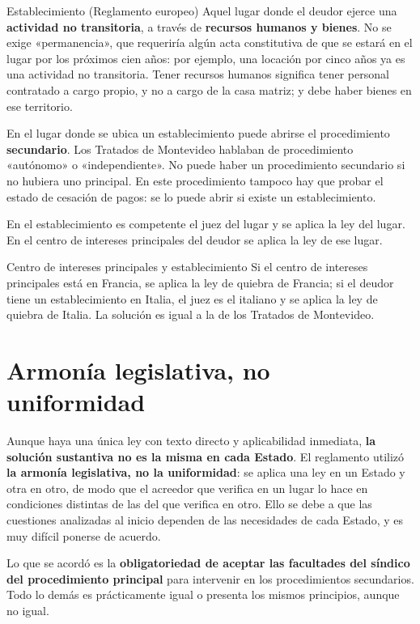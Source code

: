 \documentclass[12pt,oneside]{book}
\begin{document}
\begin{definition}{Establecimiento (Reglamento europeo)}
Aquel lugar donde el deudor ejerce una \textbf{actividad no transitoria}, a través de \textbf{recursos humanos y bienes}. No se exige «permanencia», que requeriría algún acta constitutiva de que se estará en el lugar por los próximos cien años: por ejemplo, una locación por cinco años ya es una actividad no transitoria. Tener recursos humanos significa tener personal contratado a cargo propio, y no a cargo de la casa matriz; y debe haber bienes en ese territorio.
\end{definition}

En el lugar donde se ubica un establecimiento puede abrirse el procedimiento \textbf{secundario}. Los Tratados de Montevideo hablaban de procedimiento «autónomo» o «independiente». No puede haber un procedimiento secundario si no hubiera uno principal. En este procedimiento tampoco hay que probar el estado de cesación de pagos: se lo puede abrir si existe un establecimiento.

En el establecimiento es competente el juez del lugar y se aplica la ley del lugar. En el centro de intereses principales del deudor se aplica la ley de ese lugar.

\begin{example}{Centro de intereses principales y establecimiento}
Si el centro de intereses principales está en Francia, se aplica la ley de quiebra de Francia; si el deudor tiene un establecimiento en Italia, el juez es el italiano y se aplica la ley de quiebra de Italia. La solución es igual a la de los Tratados de Montevideo.
\end{example}

\section{Armonía legislativa, no uniformidad}

Aunque haya una única ley con texto directo y aplicabilidad inmediata, \textbf{la solución sustantiva no es la misma en cada Estado}. El reglamento utilizó \textbf{la armonía legislativa, no la uniformidad}: se aplica una ley en un Estado y otra en otro, de modo que el acreedor que verifica en un lugar lo hace en condiciones distintas de las del que verifica en otro. Ello se debe a que las cuestiones analizadas al inicio dependen de las necesidades de cada Estado, y es muy difícil ponerse de acuerdo.

Lo que se acordó es la \textbf{obligatoriedad de aceptar las facultades del síndico del procedimiento principal} para intervenir en los procedimientos secundarios. Todo lo demás es prácticamente igual o presenta los mismos principios, aunque no igual.
\end{document}
